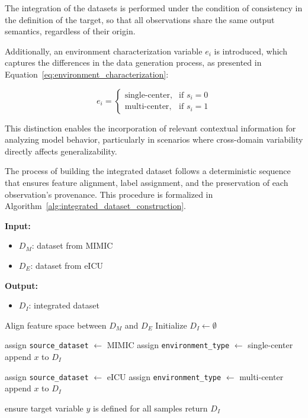 \documentclass[utf8]{FrontiersinHarvard} %
\begin{document}
The integration of the datasets is performed under the condition of consistency in the definition of the target, so that all observations share the same output semantics, regardless of their origin.

Additionally, an environment characterization variable $e_i$ is introduced, which captures the differences in the data generation process, as presented in Equation~\ref{eq:environment_characterization}:

\begin{equation}
	e_i =
	\begin{cases}
		\text{single-center}, & \text{if } s_i = 0 \\
		\text{multi-center}, & \text{if } s_i = 1
	\end{cases}
	\label{eq:environment_characterization}
\end{equation}

This distinction enables the incorporation of relevant contextual information for analyzing model behavior, particularly in scenarios where cross-domain variability directly affects generalizability.

The process of building the integrated dataset follows a deterministic sequence that ensures feature alignment, label assignment, and the preservation of each observation's provenance. This procedure is formalized in Algorithm~\ref{alg:integrated_dataset_construction}.

\begin{algorithm}
	\caption{Integrated dataset construction for multi-environment learning}
	\label{alg:integrated_dataset_construction}

	\textbf{Input:}
	\begin{itemize}
		\item $D_M$: dataset from MIMIC
		\item $D_E$: dataset from eICU
	\end{itemize}

	\textbf{Output:}
	\begin{itemize}
		\item $D_I$: integrated dataset
	\end{itemize}

	\begin{algorithmic}[1]

		\STATE Align feature space between $D_M$ and $D_E$
		\STATE Initialize $D_I \leftarrow \emptyset$

		\STATE assign \texttt{source\_dataset} $\leftarrow$ MIMIC
		\STATE assign \texttt{environment\_type} $\leftarrow$ single-center
		\STATE append $x$ to $D_I$
		\ENDFOR

		\STATE assign \texttt{source\_dataset} $\leftarrow$ eICU
		\STATE assign \texttt{environment\_type} $\leftarrow$ multi-center
		\STATE append $x$ to $D_I$
		\ENDFOR

		\STATE ensure target variable $y$ is defined for all samples
		\STATE return $D_I$

	\end{algorithmic}
\end{algorithm}
\end{document}
